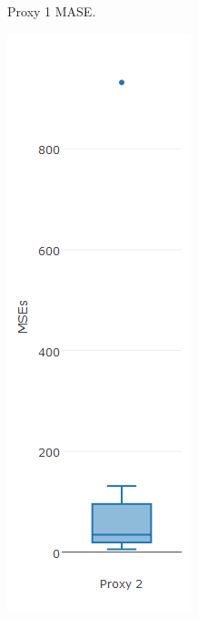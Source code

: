 \begin{figure}[!h]
{\begin{subfigure}{.25\linewidth}
  \caption{Proxy 1 MASE.}
  \label{fig:bp2b}
\end{subfigure}
\begin{subfigure}{.25\linewidth}
  \centering
  \includegraphics[width=\linewidth]{img/6mmaMsebp.png}

\end{subfigure}}
\end{figure}
